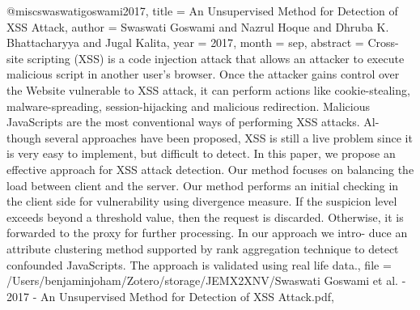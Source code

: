 @misc{swaswatigoswami2017,
  title = {An {{Unsupervised Method}} for {{Detection}} of {{XSS Attack}}},
  author = {{Swaswati Goswami} and {Nazrul Hoque} and {Dhruba K. Bhattacharyya} and {Jugal Kalita}},
  year = {2017},
  month = sep,
  abstract = {Cross-site scripting (XSS) is a code injection attack that allows an attacker to execute malicious script in another user's browser. Once the attacker gains control over the Website vulnerable to XSS attack, it can perform actions like cookie-stealing, malware-spreading, session-hijacking and malicious redirection. Malicious JavaScripts are the most conventional ways of performing XSS attacks. Al- though several approaches have been proposed, XSS is still a live problem since it is very easy to implement, but difficult to detect. In this paper, we propose an effective approach for XSS attack detection. Our method focuses on balancing the load between client and the server. Our method performs an initial checking in the client side for vulnerability using divergence measure. If the suspicion level exceeds beyond a threshold value, then the request is discarded. Otherwise, it is forwarded to the proxy for further processing. In our approach we intro- duce an attribute clustering method supported by rank aggregation technique to detect confounded JavaScripts. The approach is validated using real life data.},
  file = {/Users/benjaminjoham/Zotero/storage/JEMX2XNV/Swaswati Goswami et al. - 2017 - An Unsupervised Method for Detection of XSS Attack.pdf},
}


